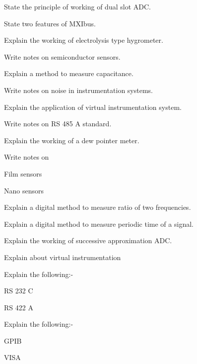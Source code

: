 \item State the principle of working of dual slot ADC.

\item State two features of MXIbus.


\markA

\partB


\item Explain the working of electrolysis type hygrometer.

\item Write notes on semiconductor sensors.

\item Explain a method to measure capacitance.

\item Write notes on noise in instrumentation systems.

\item Explain the application of virtual instrumentation system.

\item Write notes on RS 485 A standard.


\markB

\partC


\item \iitem Explain the working of a dew pointer meter.

\Or

\newpage
\again


\item Write notes on 

\iitem Film sensors

\item Nano sensors

\ene
\ene

\item \iitem Explain a digital method to measure ratio of two frequencies.

\Or

\item Explain a digital method to measure periodic time of a signal.

\ene


\item \iitem Explain the working of successive approximation ADC.

\Or

\item Explain about virtual instrumentation

\ene


\item \iitem Explain the following:-

\iitem RS 232 C

\item RS 422 A

\ene \Or

\item Explain the following:-

\iitem GPIB

\item VISA

\ene
\ene
\ene


